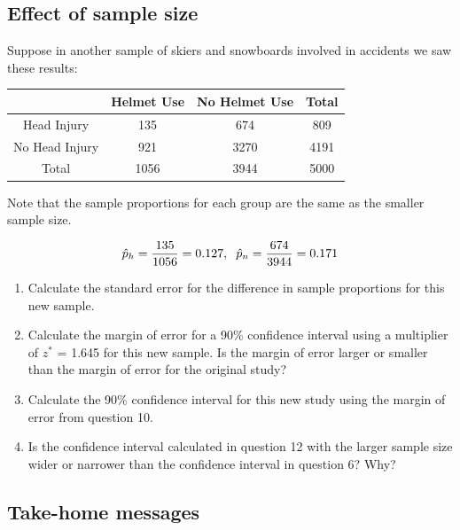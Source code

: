 \documentclass[
]{report}
\begin{document}
\hypertarget{effect-of-sample-size-1}{%
\subsection{Effect of sample size}\label{effect-of-sample-size-1}}

Suppose in another sample of skiers and snowboards involved in accidents we saw these results:

\begin{longtable}[]{@{}cccc@{}}
\toprule\noalign{}
& Helmet Use & No Helmet Use & Total \\
\midrule\noalign{}
\endhead
\bottomrule\noalign{}
\endlastfoot
Head Injury & 135 & 674 & 809 \\
No Head Injury & 921 & 3270 & 4191 \\
Total & 1056 & 3944 & 5000 \\
\end{longtable}

Note that the sample proportions for each group are the same as the smaller sample size.

\[\hat{p}_h = \frac{135}{1056}=0.127, \hspace{2mm} \hat{p}_n = \frac{674}{3944}=0.171\]

\begin{enumerate}
\def\labelenumi{\arabic{enumi}.}
\setcounter{enumi}{9}
\item
  Calculate the standard error for the difference in sample proportions for this new sample.
  \vspace{0.8in}
\item
  Calculate the margin of error for a 90\% confidence interval using a multiplier of \(z^*\) = 1.645 for this new sample. Is the margin of error larger or smaller than the margin of error for the original study?
  \vspace{.8in}
\item
  Calculate the 90\% confidence interval for this new study using the margin of error from question 10.\\
  \vspace{.8in}
\item
  Is the confidence interval calculated in question 12 with the larger sample size wider or narrower than the confidence interval in question 6? Why?
  \vspace{.8in}
\end{enumerate}

\newpage

\hypertarget{take-home-messages-14}{%
\subsection{Take-home messages}\label{take-home-messages-14}}
\end{document}
